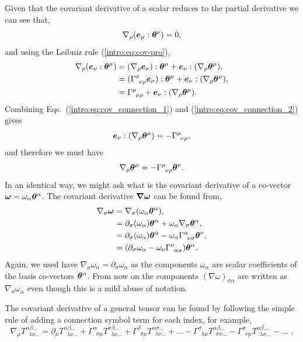 Given that the covariant derivative of a scalar reduces to the partial derivative we can see that,
\begin{equation}
\nabla_\rho (\boldsymbol{e}_\mu : \boldsymbol{\theta}^\nu) = 0,\label{intro:eq:cov_connection_1}
\end{equation}
and using the Leibniz rule (\ref{intro:eq:cov-pro}),
\begin{align}
\nabla_\rho (\boldsymbol{e}_\nu : \boldsymbol{\theta}^\mu) &= (\nabla_\rho \boldsymbol{e}_\nu):\boldsymbol{\theta}^\mu + \boldsymbol{e}_\nu:(\nabla_\rho \boldsymbol{\theta}^\mu),\\
 &= (\Gamma^\sigma_{\,\,\,\nu\rho}\boldsymbol{e}_\sigma):\boldsymbol{\theta}^\mu + \boldsymbol{e}_\nu:(\nabla_\rho \boldsymbol{\theta}^\mu),\\
  &= \Gamma^\mu_{\,\,\,\nu\rho} + \boldsymbol{e}_\nu:(\nabla_\rho \boldsymbol{\theta}^\mu). \label{intro:eq:cov_connection_2}
\end{align}
Combining Eqs.~(\ref{intro:eq:cov_connection_1}) and (\ref{intro:eq:cov_connection_2}) gives
\begin{equation}
  \boldsymbol{e}_\nu:(\nabla_\rho \boldsymbol{\theta}^\mu) = -\Gamma^\mu_{\,\,\,\nu\rho},
\end{equation}
and therefore we must have
\begin{equation}
\nabla_\rho \boldsymbol{\theta}^\mu = -\Gamma^\mu_{\,\,\,\nu\rho} \boldsymbol{\theta}^\nu.
\end{equation}
In an identical way, we might ask what is the covariant derivative of a co-vector $\boldsymbol{\omega}=\omega_\alpha \boldsymbol{\theta}^\alpha$. The covariant derivative $\boldsymbol{\nabla \omega}$ can be found from,
\begin{align}
\nabla_\sigma \boldsymbol {\omega} &= \nabla_\sigma(\omega_\alpha \boldsymbol{\theta}^\alpha),\\
&= \partial_\sigma(\omega_\alpha) \boldsymbol{\theta}^\alpha + \omega_\alpha  \nabla_\sigma \boldsymbol{\theta}^\alpha,\\
&= \partial_\sigma(\omega_\alpha) \boldsymbol{\theta}^\alpha - \omega_\alpha \Gamma^\alpha_{\,\,\,\nu\sigma} \boldsymbol\theta^\nu ,\\
&= (\partial_\sigma\omega_\alpha  - \omega_\nu \Gamma^\nu_{\,\,\,\alpha\sigma} )\boldsymbol\theta^\alpha .
\end{align}
Again, we used have $\nabla_\sigma \omega_\alpha = \partial_\sigma \omega_\alpha$ as the components $\omega_\alpha$ are scalar coefficients of the basis co-vectors $\boldsymbol{\theta}^\alpha$. From now on the components $(\nabla \omega)_{\sigma\alpha} $ are written as $ \nabla_\sigma \omega_\alpha$ even though this is a mild abuse of notation.

The covariant derivative of a general tensor can be found by following the simple rule of adding a connection symbol term for each index, for example,
\begin{equation}
\nabla_\mu T^{\alpha\beta ...}_{\,\,\,\lambda\nu ...} = \partial_\mu T^{\alpha\beta ...}_{\,\,\,\lambda\nu ...}
+ \Gamma^{\alpha}_{\,\,\,\sigma \mu} T^{\sigma\beta ...}_{\,\,\,\lambda\nu ...} + \Gamma^{\beta}_{\,\,\,\sigma\mu} T^{\alpha\sigma ...}_{\,\,\,\lambda\nu ...} + ...
- \Gamma^{\sigma}_{\,\,\,\lambda\mu} T^{\alpha\beta ...}_{\,\,\,\sigma\nu ...} - \Gamma^{\sigma}_{\,\,\,\nu\mu} T^{\alpha\beta ...}_{\,\,\,\lambda\sigma ...} - ...
\,\,.\end{equation}




